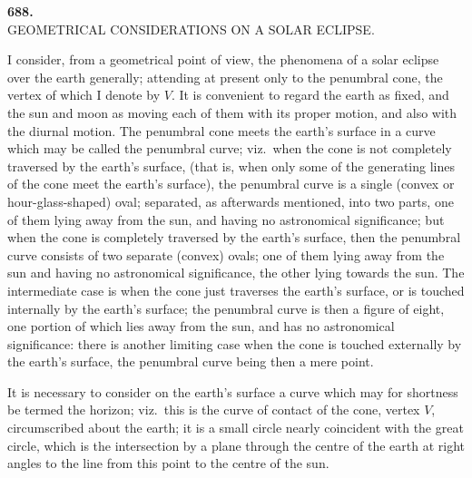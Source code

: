 \documentclass[11pt,a4paper]{article}
\begin{document}
\newpage



\begin{center}
\textbf{688.}\\[6pt]
\large GEOMETRICAL CONSIDERATIONS ON A SOLAR ECLIPSE.
\end{center}

\medskip


\medskip

I consider, from a geometrical point of view, the phenomena of a solar eclipse over the earth generally; attending at present only to the penumbral cone, the vertex of which I denote by $V$. It is convenient to regard the earth as fixed, and the sun and moon as moving each of them with its proper motion, and also with the diurnal motion. The penumbral cone meets the earth's surface in a curve which may be called the penumbral curve; viz.\ when the cone is not completely traversed by the earth's surface, (that is, when only some of the generating lines of the cone meet the earth's surface), the penumbral curve is a single (convex or hour-glass-shaped) oval; separated, as afterwards mentioned, into two parts, one of them lying away from the sun, and having no astronomical significance; but when the cone is completely traversed by the earth's surface, then the penumbral curve consists of two separate (convex) ovals; one of them lying away from the sun and having no astronomical significance, the other lying towards the sun. The intermediate case is when the cone just traverses the earth's surface, or is touched internally by the earth's surface; the penumbral curve is then a figure of eight, one portion of which lies away from the sun, and has no astronomical significance: there is another limiting case when the cone is touched externally by the earth's surface, the penumbral curve being then a mere point.

\medskip

It is necessary to consider on the earth's surface a curve which may for shortness be termed the horizon; viz.\ this is the curve of contact of the cone, vertex $V$, circumscribed about the earth; it is a small circle nearly coincident with the great circle, which is the intersection by a plane through the centre of the earth at right angles to the line from this point to the centre of the sun.
\end{document}
